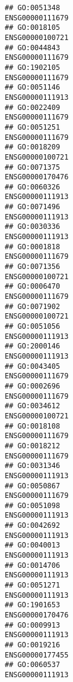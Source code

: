 \documentclass[
]{article}
\begin{document}
\begin{verbatim}
## GO:0051348                                                 ENSG00000111679
## GO:0018105                                                 ENSG00000100721
## GO:0044843                                                 ENSG00000111679
## GO:1902105                                                 ENSG00000111679
## GO:0051146                                                 ENSG00000111913
## GO:0022409                                                 ENSG00000111679
## GO:0051251                                                 ENSG00000111679
## GO:0018209                                                 ENSG00000100721
## GO:0071375                                                 ENSG00000170476
## GO:0060326                                                 ENSG00000111913
## GO:0071496                                                 ENSG00000111913
## GO:0030336                                                 ENSG00000111913
## GO:0001818                                                 ENSG00000111679
## GO:0071356                                                 ENSG00000100721
## GO:0006470                                                 ENSG00000111679
## GO:0071902                                                 ENSG00000100721
## GO:0051056                                                 ENSG00000111913
## GO:2000146                                                 ENSG00000111913
## GO:0043405                                                 ENSG00000111679
## GO:0002696                                                 ENSG00000111679
## GO:0034612                                                 ENSG00000100721
## GO:0018108                                                 ENSG00000111679
## GO:0018212                                                 ENSG00000111679
## GO:0031346                                                 ENSG00000111913
## GO:0050867                                                 ENSG00000111679
## GO:0051098                                                 ENSG00000111913
## GO:0042692                                                 ENSG00000111913
## GO:0040013                                                 ENSG00000111913
## GO:0014706                                                 ENSG00000111913
## GO:0051271                                                 ENSG00000111913
## GO:1901653                                                 ENSG00000170476
## GO:0009913                                                 ENSG00000111913
## GO:0019216                                                 ENSG00000177455
## GO:0060537                                                 ENSG00000111913

\end{verbatim}
\end{document}
